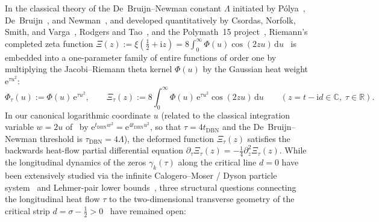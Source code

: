 \documentclass[11pt,reqno]{amsart}
\theoremstyle{definition}
\theoremstyle{remark}
\numberwithin{equation}{section}
\newcommand{\R}{\mathbb{R}}
\newcommand{\C}{\mathbb{C}}
\newcommand{\dd}{\mathrm{d}}
\newcommand{\ee}{\mathrm{e}}
\newcommand{\ii}{\mathrm{i}}
\begin{document}
In the classical theory of the De~Bruijn--Newman constant $\Lambda$ initiated by P\'olya~\cite{polya1926}, De~Bruijn~\cite{debruijn1950}, and Newman~\cite{newman1976}, and developed quantitatively by Csordas, Norfolk, Smith, and Varga~\cite{csordas1986,csordas1988,csordas1994}, Rodgers and Tao~\cite{rodgerstao2020}, and the Polymath~15 project~\cite{polymath2019}, Riemann's completed zeta function $\Xi(z) := \xi(\frac{1}{2}+\ii z) = 8\int_0^\infty \Phi(u)\cos(2zu)\,\dd u$~\cite{riemann1859,titchmarsh1986} is embedded into a one-parameter family of entire functions of order one by multiplying the Jacobi--Riemann theta kernel $\Phi(u)$ by the Gaussian heat weight $\ee^{\tau u^2}$:
\begin{equation}\label{eq:intro_xi_tau}
\Phi_\tau(u) := \Phi(u)\,\ee^{\tau u^2}, \qquad \Xi_\tau(z) := 8\int_0^{\infty} \Phi(u)\,\ee^{\tau u^2}\cos(2zu)\,\dd u \qquad (z = t - \ii d \in \C,\; \tau \in \R).
\end{equation}
In our canonical logarithmic coordinate $u$ (related to the classical integration variable $w = 2u$ of~\cite{debruijn1950,newman1976,csordas1994,rodgerstao2020} by $\ee^{t_{\mathrm{DBN}}w^2} = \ee^{4t_{\mathrm{DBN}}u^2}$, so that $\tau = 4t_{\mathrm{DBN}}$ and the De~Bruijn--Newman threshold is $\tau_{\mathrm{DBN}} = 4\Lambda$), the deformed function $\Xi_\tau(z)$ satisfies the backwards heat-flow partial differential equation $\partial_\tau\Xi_\tau(z) = -\frac{1}{4}\partial_z^2\Xi_\tau(z)$. While the longitudinal dynamics of the zeros $\gamma_k(\tau)$ along the critical line $d = 0$ have been extensively studied via the infinite Calogero--Moser / Dyson particle system~\cite{csordas1994,rodgerstao2020,polymath2019} and Lehmer-pair lower bounds~\cite{lehmer1956,csordas1988}, three structural questions connecting the longitudinal heat flow $\tau$ to the two-dimensional transverse geometry of the critical strip $d = \sigma - \frac{1}{2} > 0$~\cite{speiser1934,hinkkanen1997,lagarias1999} have remained open:
\end{document}
